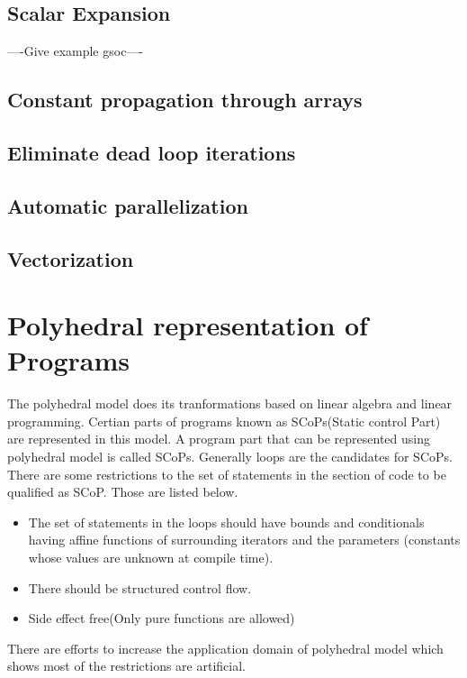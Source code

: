 \subsection{Scalar Expansion}

----Give example gsoc----

\subsection{Constant propagation through arrays}
\subsection{Eliminate dead loop iterations}
\subsection{Automatic parallelization}
\subsection{Vectorization}

\section{Polyhedral representation of Programs}

The polyhedral model does its tranformations based on linear algebra and linear programming.
Certian parts of programs known as SCoPs(Static control Part) are represented in this model.
A program part that can be represented using polyhedral model is called SCoPs. Generally
loops are the candidates for SCoPs. There are some restrictions to the set of statements 
in the section of code to be qualified as SCoP. Those are listed below.

\begin{itemize}
\item The set of statements in the loops should have bounds and conditionals having affine functions
of surrounding iterators and the parameters (constants whose values are unknown at compile time).
\item There should be structured control flow.
\item Side effect free(Only pure functions are allowed)
\end{itemize}

There are efforts to increase the application domain of polyhedral model \cite{Benabderrahmane}
which shows most of the restrictions are artificial.

